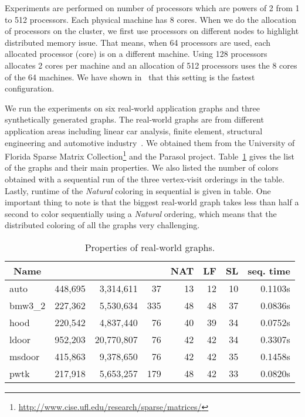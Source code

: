 \documentclass{article}
\begin{document}
Experiments are performed on number of processors which are powers of
2 from 1 to 512 processors. Each physical machine has 8
cores. When we do the allocation of processors on the cluster, we first
use processors on different nodes to highlight distributed memory
issue. That means, when 64 processors are used, each allocated processor (core)
is on a different machine. Using 128 processors allocates 2 cores per
machine and an allocation of 512 processors uses the 8 cores of the 64
machines. We have shown in~\cite{HiPC11} that this setting is the fastest configuration.

We run the experiments on six real-world application graphs and three
synthetically generated graphs. The real-world graphs are from different
application areas including linear car analysis, finite element,
structural engineering and automotive industry~\cite{GM00,SH04}. We
obtained them from the University of Florida Sparse Matrix
Collection\footnote{\url{http://www.cise.ufl.edu/research/sparse/matrices/}}
and the Parasol project. Table~\ref{tab:prop_real} gives the list of
the graphs and their main properties. We also listed the number of
colors obtained with a sequential run of the three vertex-visit
orderings in the table. Lastly, runtime of
the {\em Natural} coloring in sequential is given in table. One important thing
to note is that the biggest real-world graph takes less than half a second to color sequentially
using a {\em Natural} ordering, which means that the distributed coloring of all the
graphs very challenging.


\begin{table}
  \centering
  \begin{tabular}{|l|r|r|r|r|r|r|r|} \hline
    \multicolumn{1}{|c|}{Name} & \multicolumn{1}{|c|}{} & \multicolumn{1}{|c|}{} & \multicolumn{1}{|c|}{} & \multicolumn{1}{|c|}{NAT} & \multicolumn{1}{|c|}{LF} & \multicolumn{1}{|c|}{SL} &\multicolumn{1}{|c|}{seq. time}\\\hline
    auto    & 448,695    &  3,314,611 &  37 & 13&12&10&0.1103s\\
    bmw3\_2 & 227,362    &  5,530,634 & 335 & 48&48&37&0.0836s\\
    hood    & 220,542    &  4,837,440 &  76 & 40&39&34&0.0752s\\
    ldoor   & 952,203    & 20,770,807 &  76 & 42&42&34&0.3307s\\
    msdoor  & 415,863    &  9,378,650 &  76 & 42&42&35&0.1458s\\
    pwtk    & 217,918    &  5,653,257 & 179 & 48&42&33&0.0820s\\ \hline
  \end{tabular}
  \caption{Properties of real-world graphs.}
  \label{tab:prop_real}
\end{table}
\end{document}
